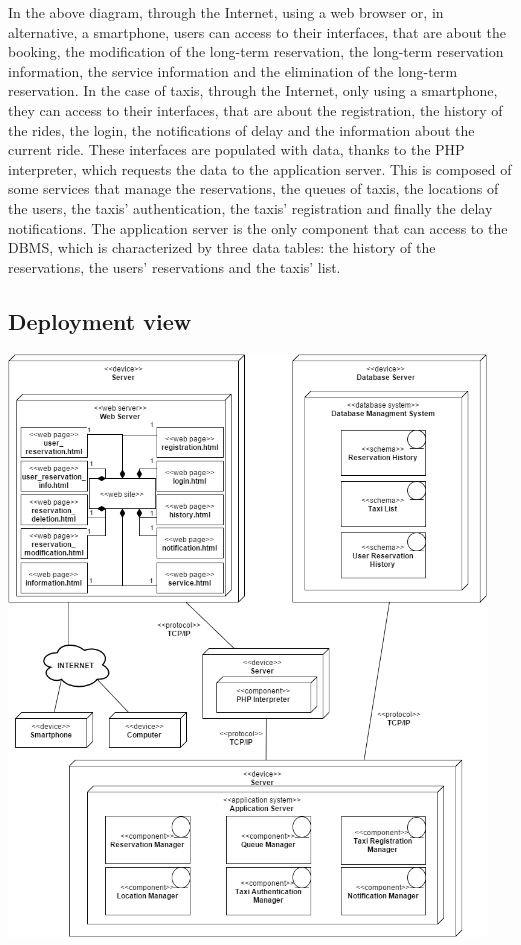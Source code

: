 	In the above diagram, through the Internet, using a web browser or, in alternative, a smartphone, users can access to their interfaces, that are about the booking, the modification of the long-term reservation, the long-term reservation information, the service information and the elimination of the long-term reservation. 
	In the case of taxis, through the Internet, only using a smartphone, they can access to their interfaces, that are about the registration, the history of the rides, the login, the notifications of delay and the information about the current ride.
	These interfaces are populated with data, thanks to the PHP interpreter, which requests the data to the application server. This is composed of some services that manage the reservations, the queues of taxis, the locations of the users, the taxis' authentication, the taxis' registration and finally the delay notifications.
	The application server is the only component that can access to the DBMS, which is characterized by three data tables: the history of the reservations, the users' reservations and the taxis' list.
\subsection{Deployment view}
	\begin{center}
		\includegraphics[width=0.95\textwidth]{./images/deployment_view.png}
	\end{center}
	

